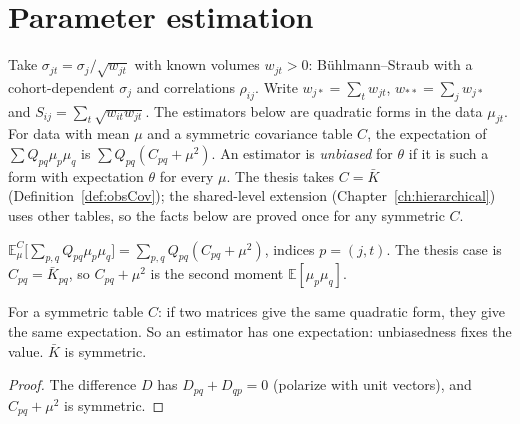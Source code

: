 \chapter{Parameter estimation}\label{ch:estimation}

Take $\sigma_{jt} = \sigma_j/\sqrt{w_{jt}}$ with known volumes $w_{jt} > 0$:
Bühlmann--Straub with a cohort-dependent $\sigma_j$ and correlations
$\rho_{ij}$. Write $w_{j*} = \sum_t w_{jt}$, $w_{**} = \sum_j w_{j*}$ and
$S_{ij} = \sum_t \sqrt{w_{it}w_{jt}}$. The estimators below are quadratic
forms in the data $\mu_{jt}$. For data with mean $\mu$ and a symmetric
covariance table $C$, the expectation of $\sum Q_{pq}\mu_p\mu_q$ is
$\sum Q_{pq}(C_{pq} + \mu^2)$. An estimator is \emph{unbiased} for $\theta$
if it is such a form with expectation $\theta$ for every $\mu$. The thesis
takes $C = \bar K$ (Definition~\ref{def:obsCov}); the shared-level extension
(Chapter~\ref{ch:hierarchical}) uses other tables, so the facts below are
proved once for any symmetric $C$.

\begin{definition}\label{def:unbiased}
  \leanok
  $\mathbb{E}^C_\mu\bigl[\sum_{p,q} Q_{pq}\mu_p\mu_q\bigr] =
  \sum_{p,q} Q_{pq}(C_{pq} + \mu^2)$, indices $p = (j,t)$. The thesis case is
  $C_{pq} = \bar K_{pq}$, so $C_{pq} + \mu^2$ is the second moment
  $\mathbb E[\mu_p\mu_q]$.
\end{definition}

\begin{lemma}\label{lem:E_congr}
  \leanok
  For a symmetric table $C$: if two matrices give the same quadratic form,
  they give the same expectation. So an estimator has one expectation:
  unbiasedness fixes the value. $\bar K$ is symmetric.
\end{lemma}
\begin{proof}
  \leanok
  The difference $D$ has $D_{pq} + D_{qp} = 0$ (polarize with unit vectors),
  and $C_{pq} + \mu^2$ is symmetric.
\end{proof}

